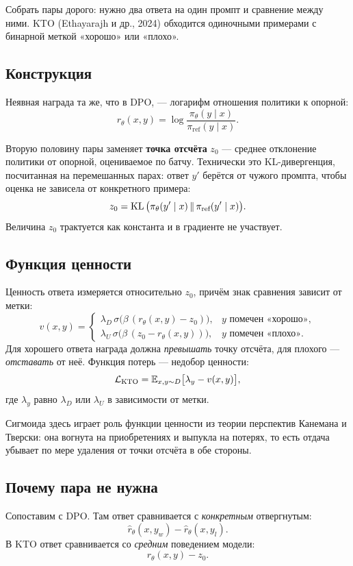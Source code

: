 \documentclass[11pt,a4paper]{article}
\begin{document}
Собрать пары дорого: нужно два ответа на один промпт и сравнение между
ними. KTO (Ethayarajh и др., 2024) обходится одиночными примерами
с бинарной меткой «хорошо» или «плохо».

\subsection{Конструкция}

Неявная награда та же, что в DPO, — логарифм отношения политики
к опорной:
\[
r_\theta(x,y) = \log\frac{\pi_\theta(y\mid x)}{\pi_{\text{ref}}(y\mid x)}.
\]

Вторую половину пары заменяет \textbf{точка отсчёта} $z_0$ — среднее
отклонение политики от опорной, оцениваемое по батчу. Технически это
KL-дивергенция, посчитанная на перемешанных парах: ответ $y'$ берётся
от чужого промпта, чтобы оценка не зависела от конкретного примера:
\[
z_0 = \operatorname{KL}\big(\pi_\theta(y'\mid x)\,\|\,\pi_{\text{ref}}(y'\mid x)\big).
\]
Величина $z_0$ трактуется как константа и в градиенте не участвует.

\subsection{Функция ценности}

Ценность ответа измеряется относительно $z_0$, причём знак сравнения
зависит от метки:
\[
v(x,y) =
\begin{cases}
\lambda_D\,\sigma\big(\beta\,(r_\theta(x,y) - z_0)\big), & y \text{ помечен «хорошо»},\\[0.4em]
\lambda_U\,\sigma\big(\beta\,(z_0 - r_\theta(x,y))\big), & y \text{ помечен «плохо»}.
\end{cases}
\]
Для хорошего ответа награда должна \emph{превышать} точку отсчёта, для
плохого — \emph{отставать} от неё. Функция потерь — недобор ценности:
\[
\mathcal{L}_{\text{KTO}} = \mathbb{E}_{x,y\sim D}\big[\lambda_y - v(x,y)\big],
\]
где $\lambda_y$ равно $\lambda_D$ или $\lambda_U$ в зависимости от метки.

Сигмоида здесь играет роль функции ценности из теории перспектив
Канемана и Тверски: она вогнута на приобретениях и выпукла на потерях,
то есть отдача убывает по мере удаления от точки отсчёта в обе стороны.

\subsection{Почему пара не нужна}

Сопоставим с DPO. Там ответ сравнивается с \emph{конкретным}
отвергнутым:
\[
\hat r_\theta(x, y_w) - \hat r_\theta(x, y_l).
\]
В KTO ответ сравнивается со \emph{средним} поведением модели:
\[
r_\theta(x,y) - z_0 .
\]
\end{document}
